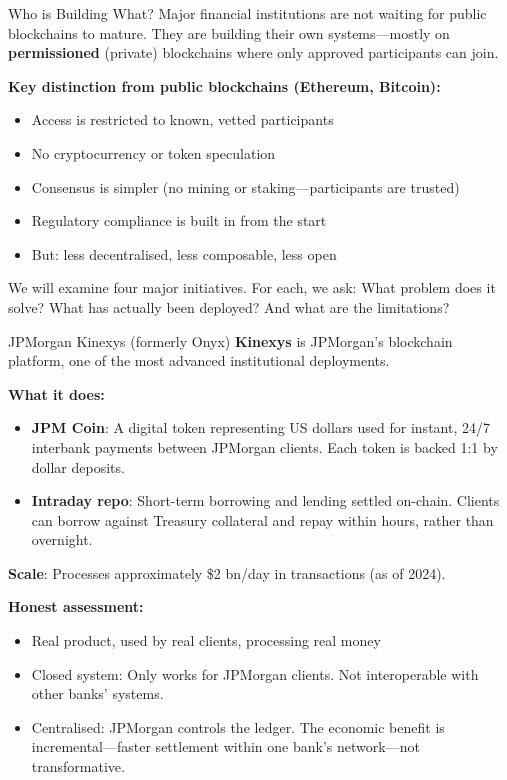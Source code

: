 \documentclass[10pt]{beamer}
\newcommand{\highlight}[1]{\textcolor{AccentOrange}{\textbf{#1}}}
\newcommand{\good}[1]{\textcolor{AccentGreen}{#1}}
\newcommand{\bad}[1]{\textcolor{AccentOrange}{#1}}
\begin{document}
\begin{frame}{Who is Building What?}
  Major financial institutions are not waiting for public blockchains to mature. They are building their own systems---mostly on \highlight{permissioned} (private) blockchains where only approved participants can join.
  
  \vspace{1em}
  \textbf{Key distinction from public blockchains (Ethereum, Bitcoin):}
  \begin{itemize}
    \item Access is restricted to known, vetted participants
    \item No cryptocurrency or token speculation
    \item Consensus is simpler (no mining or staking---participants are trusted)
    \item Regulatory compliance is built in from the start
    \item But: less decentralised, less composable, less open
  \end{itemize}
  
  \vspace{1em}
  We will examine four major initiatives. For each, we ask: What problem does it solve? What has actually been deployed? And what are the limitations?
\end{frame}

\begin{frame}{JPMorgan Kinexys (formerly Onyx)}
  \highlight{Kinexys} is JPMorgan's blockchain platform, one of the most advanced institutional deployments.
  
  \vspace{0.5em}
  \textbf{What it does:}
  \begin{itemize}
    \item \textbf{JPM Coin}: A digital token representing US dollars used for instant, 24/7 interbank payments between JPMorgan clients. Each token is backed 1:1 by dollar deposits.
    \item \textbf{Intraday repo}: Short-term borrowing and lending settled on-chain. Clients can borrow against Treasury collateral and repay within hours, rather than overnight.
  \end{itemize}
  
  \vspace{0.5em}
  \textbf{Scale}: Processes approximately \$2 bn/day in transactions (as of 2024).
  
  \vspace{0.5em}
  \textbf{Honest assessment:}
  \begin{itemize}
    \item \good{Real product}, used by real clients, processing real money
    \item \bad{Closed system}: Only works for JPMorgan clients. Not interoperable with other banks' systems.
    \item \bad{Centralised}: JPMorgan controls the ledger. The economic benefit is incremental---faster settlement within one bank's network---not transformative.
  \end{itemize}
\end{frame}
\end{document}
